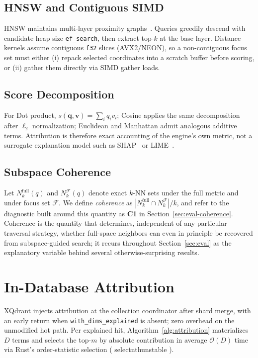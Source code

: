 \documentclass[sigconf,review,balance=false]{acmart}
\newcommand{\breakablecode}[1]{%
  {\ttfamily
    \renewcommand{\_}{\textunderscore\allowbreak}%
    #1%
  }}
\begin{document}
\subsection{HNSW and Contiguous SIMD}

HNSW maintains multi-layer proximity graphs~\cite{malkov2018hnsw}. Queries
greedily descend with candidate heap size \texttt{ef\_search}, then extract
top-$k$ at the base layer. Distance kernels assume contiguous \texttt{f32}
slices (AVX2/NEON), so a non-contiguous focus set must either (i) repack
selected coordinates into a scratch buffer before scoring, or (ii) gather them
directly via SIMD gather loads.

\subsection{Score Decomposition}

For Dot product, $s(\mathbf{q},\mathbf{v})=\sum_i q_i v_i$; Cosine applies the
same decomposition after $\ell_2$ normalization; Euclidean and Manhattan admit
analogous additive terms. Attribution is therefore exact accounting of the
engine's own metric, not a surrogate explanation model such as
SHAP~\cite{lundberg2017shap} or LIME~\cite{ribeiro2016lime}.

\subsection{Subspace Coherence}
\label{sec:coherence-def}

Let $N_k^{\mathrm{full}}(q)$ and $N_k^{\mathcal{F}}(q)$ denote exact $k$-NN sets
under the full metric and under focus set $\mathcal{F}$. We define
\emph{coherence} as $|N_k^{\mathrm{full}}\cap N_k^{\mathcal{F}}|/k$, and refer
to the diagnostic built around this quantity as \textbf{C1} in
Section~\ref{sec:eval-coherence}. Coherence is the quantity that determines,
independent of any particular traversal strategy, whether full-space neighbors
can even in principle be recovered from subspace-guided search; it recurs
throughout Section~\ref{sec:eval} as the explanatory variable behind several
otherwise-surprising results.

\section{In-Database Attribution}
\label{sec:attribution}

XQdrant injects attribution at the collection coordinator after shard merge,
with an early return when \texttt{with\_dims\_explained} is absent; zero
overhead on the unmodified hot path. Per explained hit, Algorithm~\ref{alg:attribution}
materializes $D$ terms and selects the top-$m$ by absolute contribution in
average $\mathcal{O}(D)$ time via Rust's order-statistic selection
(\breakablecode{select\_nth\_unstable}).
\end{document}
